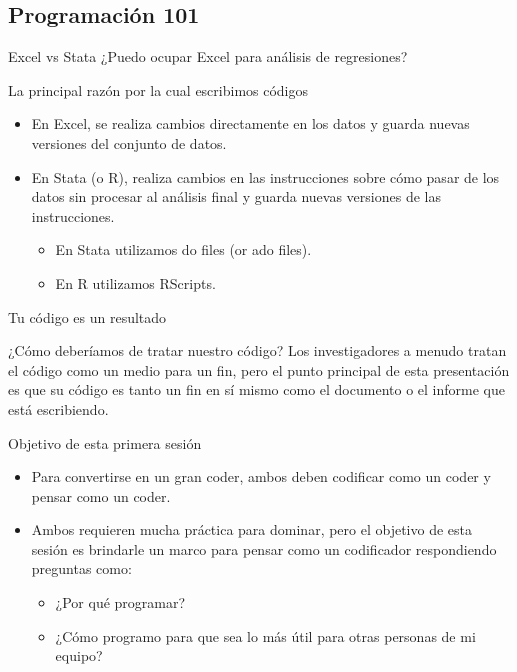 \documentclass[11pt, aspectratio=169, compress]{beamer}
\begin{document}
\subsection{Programación 101}
\begin{frame}{Excel vs Stata}
	¿Puedo ocupar Excel para análisis de regresiones?
\end{frame}
\begin{frame}{La principal razón por la cual escribimos códigos}
	\begin{itemize}
		\item En Excel, se realiza cambios directamente en los datos y guarda nuevas versiones del conjunto de datos. 
		\item En Stata (o R), realiza cambios en las instrucciones sobre cómo pasar de los datos sin procesar al análisis final y guarda nuevas versiones de las instrucciones.
		\begin{itemize}
			\item En Stata utilizamos do files (or ado files).
			\item En R utilizamos RScripts.
		\end{itemize}
	\end{itemize}
\end{frame}
\begin{frame}{Tu código es un resultado}
	\begin{block}{¿Cómo deberíamos de tratar nuestro código?}
		Los investigadores a menudo tratan el código como un medio para un fin, pero el punto principal de esta presentación es que su código es tanto un fin en sí mismo como el documento o el informe que está escribiendo.
	\end{block}
\end{frame}
\begin{frame}{Objetivo de esta primera sesión}
	\begin{itemize}
		\item Para convertirse en un gran coder, ambos deben codificar como un coder y pensar como un coder.

		\item Ambos requieren mucha práctica para dominar, pero el objetivo de esta sesión es brindarle un marco para pensar como un codificador respondiendo preguntas como:
		
		\begin{itemize}
			\item ¿Por qué programar?
		
			\item ¿Cómo programo para que sea lo más útil para otras personas de mi equipo?
		\end{itemize}	
	\end{itemize}

\end{frame}
\end{document}
